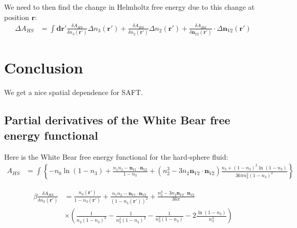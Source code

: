 \documentclass[letterpaper,twocolumn,amsmath,amssymb,prb]{revtex4-1}
\begin{document}
\begin{widetext}
We need to then find the change in Helmholtz free energy due to this
change at position $\mathbf{r}$:
\begin{align}
  \Delta A_{HS} &= \int \mathbf{dr}'
  \frac{\delta A_{HS}}{\delta n_3(\mathbf{r}')}\Delta n_3(\mathbf{r}')
  +
  \frac{\delta A_{HS}}{\delta n_2(\mathbf{r}')}\Delta n_2(\mathbf{r}')
  +
  \frac{\delta A_{HS}}{\delta \mathbf{n}_{V2}(\mathbf{r}')} \cdot \Delta \mathbf{n}_{V2}(\mathbf{r}')
\end{align}

\end{widetext}

\section{Conclusion}
We get a nice spatial dependence for SAFT.

\begin{widetext}
  \appendix

  \section{Partial derivatives of the White Bear free energy functional}

  Here is the White Bear free energy functional for the hard-sphere
  fluid:~\cite{roth2002whitebear}
  \begin{align}
    A_{HS} &= \int \left\{
    -n_0 \ln\left( 1 - n_3\right)
    + \frac{n_1 n_2 - \mathbf{n}_{V1} \cdot\mathbf{n}_{V2}}{1-n_3}
    + (n_2^3 - 3 n_2 \mathbf{n}_{V2} \cdot \mathbf{n}_{V2}) \frac{
      n_3 + (1-n_3)^2 \ln(1-n_3)
    }{
      36\pi n_3^2(1-n_3)^2
    }
    \right\}
\end{align}

\begin{align}
    \beta\frac{\delta A_{HS}}{\delta n_3(\mathbf{r}')} &=
    \frac{n_0(\mathbf{r}')}{1 - n_3(\mathbf{r}')}
    + \frac{n_1n_2 - \mathbf{n}_{V1}\cdot\mathbf{n}_{V2}}{(1 -
      n_3(\mathbf{r}'))^2}
    + \frac{n_2^3 -
      3n_2\mathbf{n}_{V2}\cdot\mathbf{n}_{V2}}{36\pi}
    \\
    & \times \left(\frac{1}{n_3(1-n_3)^3} -\frac1{n_3^2(1-n_3)^2}  -
      \frac{1}{n_3^2(1-n_3)} - 2\frac{\ln(1-n_3)}{n_3^3}\right)
\end{align}
\end{widetext}
\end{document}
